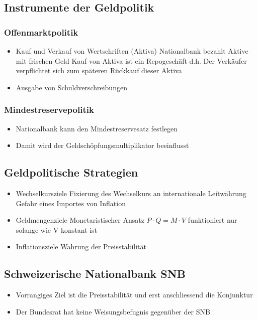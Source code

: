 \subsection{Instrumente der Geldpolitik}
\subsubsection{Offenmarktpolitik}
\begin{itemize}
	\item Kauf und Verkauf von Wertschriften (Aktiva)
	\subitem Nationalbank bezahlt Aktive mit frischen Geld
	\subitem Kauf von Aktiva ist ein Repogeschäft d.h. Der Verkäufer verpflichtet sich zum späteren Rückkauf dieser Aktiva
	\item Ausgabe von Schuldverschreibungen 
\end{itemize}
\subsubsection{Mindestreservepolitik}
\begin{itemize}
	\item Nationalbank kann den Mindestreservesatz festlegen
	\item Damit wird der Geldschöpfungsmultiplikator beeinflusst
\end{itemize}
\subsection{Geldpolitische Strategien}
\begin{itemize}
	\item Wechselkursziele
	\subitem Fixierung des Wechselkurs an internationale Leitwährung
	\subitem Gefahr eines Importes von Inflation
	\item Geldmengenziele
	\subitem Monetaristischer Ansatz $P \cdot Q = M \cdot V$
	\subitem funktioniert nur solange wie V konstant ist
	\item Inflationsziele
	\subitem Wahrung der Preisstabilität
\end{itemize}
\subsection{Schweizerische Nationalbank SNB}
\begin{itemize}
	\item Vorrangiges Ziel ist die Preisstabilität und erst anschliessend die Konjunktur
	\item Der Bundesrat hat keine Weisungsbefugnis gegenüber der SNB
\end{itemize}